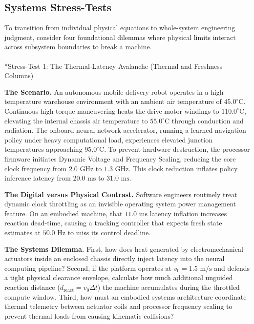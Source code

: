 \documentclass[
  letterpaper,
  DIV=11,
  numbers=noendperiod]{scrartcl}
\makeatletter
\let\oldparagraph\paragraph
\renewcommand{\paragraph}{
    \@ifstar
      \xxxParagraphStar
      \xxxParagraphNoStar
  }
\newcommand{\xxxParagraphStar}[1]{\oldparagraph*{#1}\mbox{}}
\newcommand{\xxxParagraphNoStar}[1]{\oldparagraph{#1}\mbox{}}
\makeatother
\begin{document}
\subsection{Systems Stress-Tests}\label{sec-body-2-8}

To transition from individual physical equations to whole-system
engineering judgment, consider four foundational dilemmas where physical
limits interact across subsystem boundaries to break a machine.

\paragraph*{Stress-Test 1: The Thermal-Latency Avalanche (Thermal and
Freshness
Columns)}\label{stress-test-1-the-thermal-latency-avalanche-thermal-and-freshness-columns}

\textbf{The Scenario.} An autonomous mobile delivery robot operates in a
high-temperature warehouse environment with an ambient air temperature
of \(45.0^{\circ}\text{C}\). Continuous high-torque maneuvering heats
the drive motor windings to \(110.0^{\circ}\text{C}\), elevating the
internal chassis air temperature to \(55.0^{\circ}\text{C}\) through
conduction and radiation. The onboard neural network accelerator,
running a learned navigation policy under heavy computational load,
experiences elevated junction temperatures approaching
\(95.0^{\circ}\text{C}\). To prevent hardware destruction, the processor
firmware initiates Dynamic Voltage and Frequency Scaling, reducing the
core clock frequency from \(2.0\text{ GHz}\) to \(1.3\text{ GHz}\). This
clock reduction inflates policy inference latency from
\(20.0\text{ ms}\) to \(31.0\text{ ms}\).

\textbf{The Digital versus Physical Contrast.} Software engineers
routinely treat dynamic clock throttling as an invisible operating
system power management feature. On an embodied machine, that
\(11.0\text{ ms}\) latency inflation increases reaction dead-time,
causing a tracking controller that expects fresh state estimates at
\(50.0\text{ Hz}\) to miss its control deadline.

\textbf{The Systems Dilemma.} First, how does heat generated by
electromechanical actuators inside an enclosed chassis directly inject
latency into the neural computing pipeline? Second, if the platform
operates at \(v_0 = 1.5\text{ m/s}\) and defends a tight physical
clearance envelope, calculate how much additional unguided reaction
distance (\(d_{\text{react}} = v_0 \Delta t\)) the machine accumulates
during the throttled compute window. Third, how must an embodied systems
architecture coordinate thermal telemetry between actuator coils and
processor frequency scaling to prevent thermal loads from causing
kinematic collisions?
\end{document}
